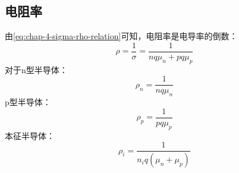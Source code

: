 \subsection{电阻率}

由\autoref{eq:chap-4-sigma-rho-relation}可知，电阻率是电导率的倒数：
\begin{equation}
    \rho=\frac{1}{\sigma}=\frac{1}{nq\mu_n+pq\mu_p}
\end{equation}
对于n型半导体：
\begin{equation}
    \rho_n=\frac{1}{nq\mu_n}
\end{equation}
p型半导体：
\begin{equation}
    \rho_p=\frac{1}{pq\mu_p}
\end{equation}
本征半导体：
\begin{equation}
    \rho_i=\frac{1}{n_iq(\mu_n+\mu_p)}
\end{equation}














